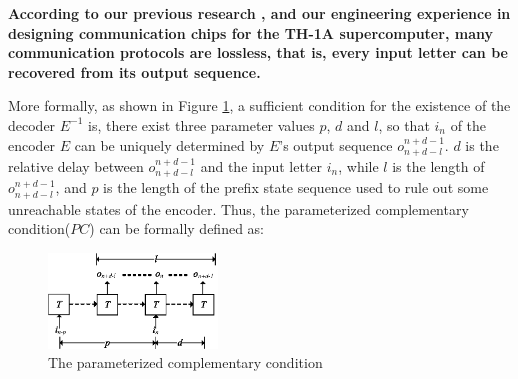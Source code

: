\documentclass[journal]{IEEEtran}
\begin{document}
\textbf{According to our previous research \cite{ShengYuShen:iccad09,ShengYuShen:tcad,ShengYuShen:fmcad10},
and our engineering experience in designing communication chips for the TH-1A supercomputer\cite{TH1A},
many communication protocols are lossless,
that is,
every input letter can be recovered from its output sequence.}

More formally,
as shown in Figure \ref{t1},
a sufficient condition for the existence of the decoder $E^{-1}$ is,
there exist three parameter values $p$, $d$ and $l$,
so that $i_n$ of the encoder $E$ can be uniquely determined by $E$'s output sequence $o_{n+d-l}^{n+d-1}$.
$d$ is the relative delay between $o_{n+d-l}^{n+d-1}$ and the input letter $i_n$,
while $l$ is the length of $o_{n+d-l}^{n+d-1}$,
and $p$ is the length of the prefix state sequence used to rule out some unreachable states of the encoder.
Thus,
the parameterized complementary condition($PC$)\cite{ShengYuShen:iccad09} can be formally defined  as:

\begin{figure}[t]
\begin{center}
\includegraphics[width=0.4\textwidth]{t1}
\end{center}
\caption{The parameterized complementary condition}
  \label{t1}
\end{figure}
\end{document}
